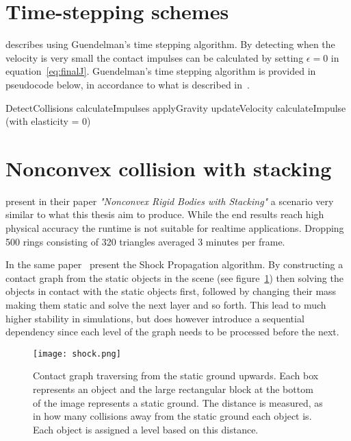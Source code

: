 {\section{Time-stepping schemes}
\cite{Lembcke} describes using Guendelman's time stepping
algorithm. By detecting when the velocity is very small the contact impulses can be
calculated by setting $\epsilon = 0$ in equation~\ref{eq:finalJ}.
Guendelman's time stepping algorithm is provided in pseudocode below, in accordance
to what is described in~\cite{guendelman}.

\begin{algorithm}[H]
  \begin{algorithmic}[1]
  \State DetectCollisions
    \State calculateImpulses
  \EndFor
  \State applyGravity
  \State updateVelocity
      \State calculateImpulse (with elasticity = 0)
    \EndFor
\end{algorithmic}
\end{algorithm}

\section{Nonconvex collision with stacking}
\cite{guendelman} present in their paper \textit{"Nonconvex Rigid Bodies with Stacking"}
a scenario very similar to what this thesis aim to produce.
While the end results reach high physical accuracy the runtime is not suitable for realtime applications.
 Dropping 500 rings consisting of 320 triangles averaged 3 minutes per frame.

In the same paper~\cite{guendelman} present the Shock Propagation algorithm.
By constructing a contact graph from the static objects in the scene (see figure~\ref{fig:cont})
then solving the objects in contact with the static objects first, followed by changing their
mass making them static and solve the next layer and so forth. This lead to much
higher stability in simulations, but does however introduce a sequential dependency
since each level of the graph needs to be processed before the next.

\begin{figure}[H]
  \centering
  \texttt{[image: shock.png]}
  \caption{Contact graph traversing from the static ground upwards. Each box
  represents an object and the large rectangular block at the bottom of the
  image represents a static ground. The distance is measured, as in how many collisions away from the static ground each object is. Each object is assigned a level based on this distance.}
  \label{fig:cont}
\end{figure}

}
